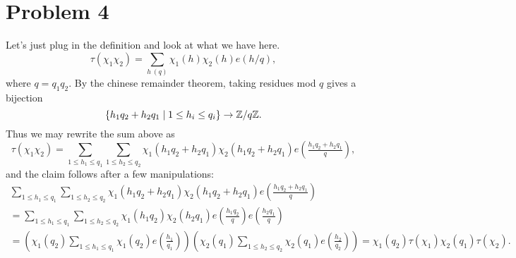 \documentclass[a4paper,11pt]{article}
\begin{document}
\section*{Problem 4}
Let's just plug in the definition and look at what we have here.
\[
    \tau(\chi_1 \chi_2) = \sum_{h \ (q)} \chi_1(h) \chi_2(h) e(h/q),
\]
where $q = q_1 q_2$. By the chinese remainder theorem, taking residues mod $q$ gives
a bijection
\[
    \{h_1 q_2 + h_2 q_1 \mid 1 \leq h_i \leq q_i\} \to \mathbb{Z}/q\mathbb{Z}.
\]
Thus we may rewrite the sum above as 
\[
    \tau(\chi_1 \chi_2) = \sum_{1 \leq h_1 \leq q_1} \sum_{1 \leq h_2 \leq q_2}\chi_1(h_1q_2 + h_2q_1) \chi_2(h_1q_2 + h_2 q_1) e(\tfrac{h_1q_2+h_2q_1}q),
\]
and the claim follows after a few manipulations:
\begin{multline*}
     \sum_{1 \leq h_1 \leq q_1} \sum_{1 \leq h_2 \leq q_2}\chi_1(h_1q_2 + h_2q_1) \chi_2(h_1q_2
     + h_2 q_1) e(\tfrac{h_1q_2+h_2q_1}q) \\
     = \sum_{1 \leq h_1 \leq q_1} \sum_{1 \leq h_2 \leq q_2}\chi_1(h_1q_2) \chi_2(h_2 q_1)
     e(\tfrac{h_1q_2}q) e(\tfrac{h_2q_1}q) \\ 
     = \left(\chi_1(q_2)\sum_{1 \leq h_1 \leq q_1}
     \chi_1(q_2)e(\tfrac{h_1}{q_1})\right) \left(\chi_2(q_1)\sum_{1 \leq h_2 \leq q_2}
     \chi_2(q_1)e(\tfrac{h_2}{q_2})\right) = \chi_1(q_2)\tau(\chi_1) \chi_2(q_1)\tau(\chi_2).
\end{multline*}

\contactend
\end{document}
